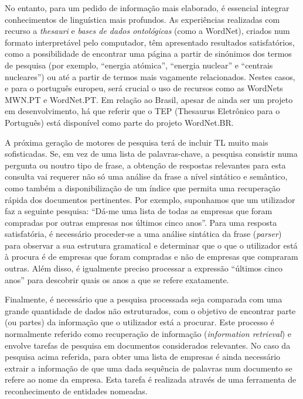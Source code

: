 \begin{multicols}{2}
No entanto, para um pedido de informação mais elaborado, é essencial integrar conhecimentos de linguística mais profundos. As experiências realizadas com recurso a \textit{thesauri} e \textit{bases de dados ontológicas} (como a WordNet), criados num formato interpretável pelo computador, têm apresentado resultados satisfatórios, como a possibilidade de encontrar uma página a partir de sinónimos dos termos de pesquisa (por exemplo, “energia atómica”, “energia nuclear” e “centrais nucleares”) ou até a partir de termos mais vagamente relacionados. Nestes casos, e para o português europeu, será crucial o uso de recursos como as WordNets MWN.PT e WordNet.PT. Em relação ao Brasil, apesar de ainda ser um projeto em desenvolvimento, há que referir que o TEP (Thesaurus Eletrônico para o Português) está disponível como parte do projeto WordNet.BR.

A próxima geração de motores de pesquisa terá de incluir TL muito mais sofisticadas. Se, em vez de uma lista de palavras-chave, a pesquisa consistir numa pergunta ou noutro tipo de frase, a obtenção de respostas relevantes para esta consulta vai requerer não só uma análise da frase a nível sintático e semântico, como também a disponibilização de um índice que permita uma recuperação rápida dos documentos pertinentes. Por exemplo, suponhamos que um utilizador faz a seguinte pesquisa: “Dá-me uma lista de todas as empresas que foram compradas por ou\-tras empresas nos últimos cinco anos”. Para uma res\-pos\-ta satisfatória, é necessário proceder-se a uma análise sintática da frase (\textit{parser}) para observar a sua estrutura gramatical e determinar que o que o utilizador está à procura é de empresas que foram compradas e não de empresas que compraram ou\-tras. Além disso, é igualmente preciso processar a expressão “últimos cinco anos” para descobrir quais os anos a que se refere exatamente.


Finalmente, é necessário que a pesquisa processada seja comparada com uma grande quantidade de dados não estruturados, com o objetivo de encontrar parte (ou partes) da informação que o utilizador está a procurar. Este processo é normalmente referido como recuperação de informação (\textit{information retrieval}) e envolve tarefas de pesquisa em documentos considerados relevantes. No caso da pesquisa acima referida, para obter uma lista de empresas é ainda necessário extrair a informação de que uma dada sequência de palavras num documento se refere ao nome da empresa. Esta tarefa é realizada através de uma ferramenta de reconhecimento de entidades nomeadas.


\end{multicols}

